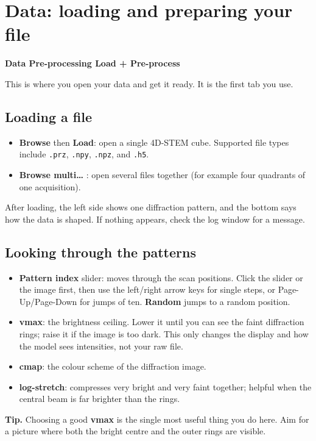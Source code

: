\documentclass[11pt]{article}
\newcommand{\btn}[1]{\textbf{#1}}
\newcommand{\tab}[1]{\textsf{\textbf{#1}}}
\newcommand{\tip}[1]{\par\smallskip\noindent\colorbox{tipc}{\parbox{\dimexpr\linewidth-2\fboxsep}{\textbf{Tip.} #1}}\par\smallskip}
\begin{document}
\section{Data: loading and preparing your file}
\tab{Data \textrightarrow{} Pre-processing \textrightarrow{} Load + Pre-process}

This is where you open your data and get it ready. It is the first tab you use.

\subsection{Loading a file}
\begin{itemize}[itemsep=2pt]
\item \btn{Browse} then \btn{Load}: open a single 4D-STEM cube. Supported file
types include \texttt{.prz}, \texttt{.npy}, \texttt{.npz}, and \texttt{.h5}.
\item \btn{Browse multi\dots} : open several files together (for example four
quadrants of one acquisition).
\end{itemize}
After loading, the left side shows one diffraction pattern, and the bottom says how
the data is shaped. If nothing appears, check the log window for a message.

\subsection{Looking through the patterns}
\begin{itemize}[itemsep=2pt]
\item \textbf{Pattern index} slider: moves through the scan positions. Click the
slider or the image first, then use the left/right arrow keys for single steps, or
Page-Up/Page-Down for jumps of ten. \btn{Random} jumps to a random position.
\item \textbf{vmax}: the brightness ceiling. Lower it until you can see the faint
diffraction rings; raise it if the image is too dark. This only changes the
display and how the model sees intensities, not your raw file.
\item \textbf{cmap}: the colour scheme of the diffraction image.
\item \textbf{log-stretch}: compresses very bright and very faint together; helpful
when the central beam is far brighter than the rings.
\end{itemize}
\tip{Choosing a good \textbf{vmax} is the single most useful thing you do here. Aim
for a picture where both the bright centre and the outer rings are visible.}
\end{document}
